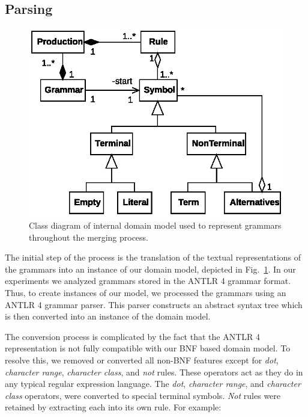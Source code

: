 \documentclass[conference]{IEEEtran}
\begin{document}
\hypertarget{sec:parsing}{%
\subsection{Parsing}\label{sec:parsing}}

\begin{figure}
\hypertarget{fig:grammar_class_diagram}{%
\centering
\includegraphics{images/paper/diagram.eps}
\caption{Class diagram of internal domain model used to represent
grammars throughout the merging
process.}\label{fig:grammar_class_diagram}
}
\end{figure}

The initial step of the process is the translation of the textual
representations of the grammars into an instance of our domain model,
depicted in Fig.~\ref{fig:grammar_class_diagram}. In our experiments we
analyzed grammars stored in the ANTLR 4 grammar format. Thus, to create
instances of our model, we processed the grammars using an ANTLR 4
grammar parser. This parser constructs an abstract syntax tree which is
then converted into an instance of the domain model.

The conversion process is complicated by the fact that the ANTLR 4
representation is not fully compatible with our BNF based domain model.
To resolve this, we removed or converted all non-BNF features except for
\emph{dot}, \emph{character range}, \emph{character class}, and
\emph{not} rules. These operators act as they do in any typical regular
expression language. The \emph{dot}, \emph{character range}, and
\emph{character class} operators, were converted to special terminal
symbols. \emph{Not} rules were retained by extracting each into its own
rule. For example:
\end{document}
